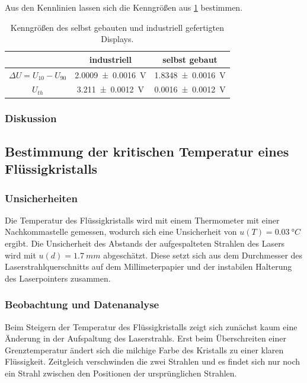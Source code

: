 \documentclass[
	a4paper,
	12pt,
	pagesize,
	ngerman
]{scrartcl}
\begin{document}
	Aus den Kennlinien lassen sich die Kenngrößen aus \cref{tb_kenngroessen} bestimmen.
	\begin{table}[H]
		\centering
		\begin{tabular}{ c | c | c }
			 & industriell & selbst gebaut \\ \hline
			$\Delta U=U_{10}-U_{90}$&\SI{2.0009+-0.0016}{V}&\SI{1.8348+-0.0016}{V} \\
			$U_{th}$ & \SI{3.211+-0.0012}{V} & \SI{0.0016+-0.0012}{V} \\
			\hline
		\end{tabular}
		\caption{Kenngrößen des selbst gebauten und industriell gefertigten Displays.}
		\label{tb_kenngroessen}
\end{table}

	\subsubsection{Diskussion}
	\subsection{Bestimmung der kritischen Temperatur eines Flüssigkristalls} %
	\subsubsection{Unsicherheiten}
	Die Temperatur des Flüssigkristalls wird mit einem Thermometer mit einer Nachkommastelle gemessen, wodurch sich eine Unsicherheit von $u(T)=\SI{0.03}{\degree C}$ ergibt.
	Die Unsicherheit des Abstands der aufgespalteten Strahlen des Lasers wird mit $u(d)=\SI{1.7}{mm}$ abgeschätzt.
	Diese setzt sich aus dem Durchmesser des Laserstrahlquerschnitts auf dem Millimeterpapier und der instabilen Halterung des Laserpointers zusammen.
	\subsubsection{Beobachtung und Datenanalyse}
	Beim Steigern der Temperatur des Flüssigkristalls zeigt sich zunächst kaum eine Änderung in der Aufspaltung des Laserstrahls.
	Erst beim Überschreiten einer Grenztemperatur ändert sich die milchige Farbe des Kristalls zu einer klaren Flüssigkeit.
	Zeitgleich verschwinden die zwei Strahlen und es findet sich nur noch ein Strahl zwischen den Positionen der ursprünglichen Strahlen.
\end{document}
